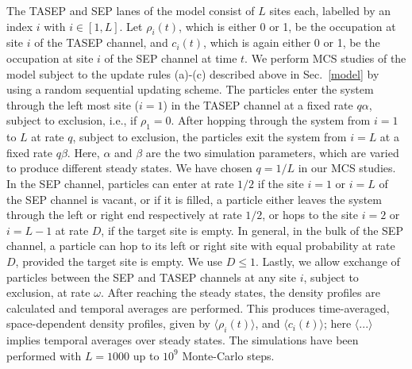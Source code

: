 \documentclass[aps,pre,twocolumn,superscriptaddress,amsmath,amssymb,longbibliography,floatfix]{revtex4}
\begin{document}
The TASEP and SEP lanes of the model consist of $L$ sites each, labelled by an index $i$ with $i\in [1,L]$.
 Let $\rho_i(t)$, which is either 0 or 1, be the occupation at site $i$ of the TASEP channel, and $c_i(t)$, which is again either 0 or 1, be the occupation at site $i$ of the SEP channel  at time $t$. {We perform MCS studies of the model subject to the update rules (a)-(c) described above in Sec.~\ref{model} by using a random sequential updating scheme. The particles enter the system through the left most site ($i=1$) in the TASEP channel at a fixed rate $q\alpha$, subject to exclusion, i.e., if $\rho_1=0$. After hopping through the system from $i=1$ to $L$ at rate $q$, subject to exclusion, the particles exit the system from $i=L$ at a fixed rate $q\beta$. Here, $\alpha$ and $\beta$ are the two simulation parameters, which are varied to produce different steady states. We have chosen $q=1/L$ in our MCS studies. }In the SEP channel, particles can enter at rate $1/2$ if the site $i=1$ or $i=L$ of the SEP channel is vacant, or if it is filled, a particle either leaves the system through the left or right end respectively at rate $1/2$, or hops to the site $i=2$ or $i=L-1$ at rate $D$, if the target site is empty. In general, in the bulk of the SEP channel, a particle can hop to its left or right site with equal probability at rate $D$, provided the target site is empty. 
 {We use $D\leq 1$}. Lastly, we allow exchange of particles between the SEP and TASEP channels at any site $i$, subject to exclusion, at rate $\omega$. After reaching the steady states, the density profiles are calculated and temporal averages are performed.  This produces time-averaged, space-dependent density profiles, given by $\langle \rho_i(t)\rangle$, and $\langle c_i(t)\rangle$; here $\langle...\rangle$ implies temporal averages over steady states. The simulations have been performed with  $L=1000$ up to $10^9$ Monte-Carlo steps. %
\end{document}
